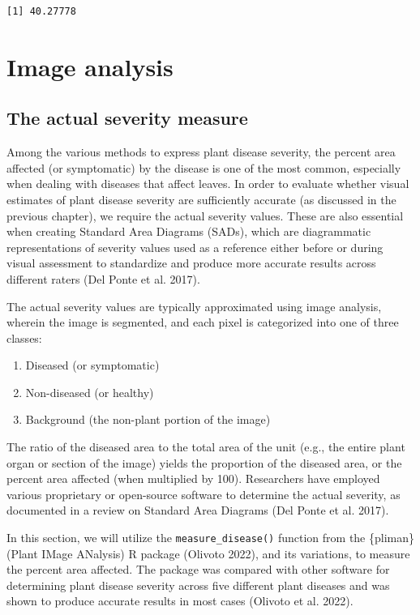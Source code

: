 \documentclass[
  letterpaper,
]{book}
\providecommand{\tightlist}{%
  \setlength{\itemsep}{0pt}\setlength{\parskip}{0pt}}\usepackage{longtable,booktabs,array}
\begin{document}
\begin{verbatim}
[1] 40.27778
\end{verbatim}

\hypertarget{image-analysis}{%
\chapter{Image analysis}\label{image-analysis}}

\hypertarget{the-actual-severity-measure}{%
\section{The actual severity
measure}\label{the-actual-severity-measure}}

Among the various methods to express plant disease severity, the percent
area affected (or symptomatic) by the disease is one of the most common,
especially when dealing with diseases that affect leaves. In order to
evaluate whether visual estimates of plant disease severity are
sufficiently accurate (as discussed in the previous chapter), we require
the actual severity values. These are also essential when creating
Standard Area Diagrams (SADs), which are diagrammatic representations of
severity values used as a reference either before or during visual
assessment to standardize and produce more accurate results across
different raters (Del Ponte et al. 2017).

The actual severity values are typically approximated using image
analysis, wherein the image is segmented, and each pixel is categorized
into one of three classes:

\begin{enumerate}
\def\labelenumi{\arabic{enumi}.}
\tightlist
\item
  Diseased (or symptomatic)
\item
  Non-diseased (or healthy)
\item
  Background (the non-plant portion of the image)
\end{enumerate}

The ratio of the diseased area to the total area of the unit (e.g., the
entire plant organ or section of the image) yields the proportion of the
diseased area, or the percent area affected (when multiplied by 100).
Researchers have employed various proprietary or open-source software to
determine the actual severity, as documented in a review on Standard
Area Diagrams (Del Ponte et al. 2017).

In this section, we will utilize the \texttt{measure\_disease()}
function from the \{pliman\} (Plant IMage ANalysis) R package (Olivoto
2022), and its variations, to measure the percent area affected. The
package was compared with other software for determining plant disease
severity across five different plant diseases and was shown to produce
accurate results in most cases (Olivoto et al. 2022).
\end{document}
